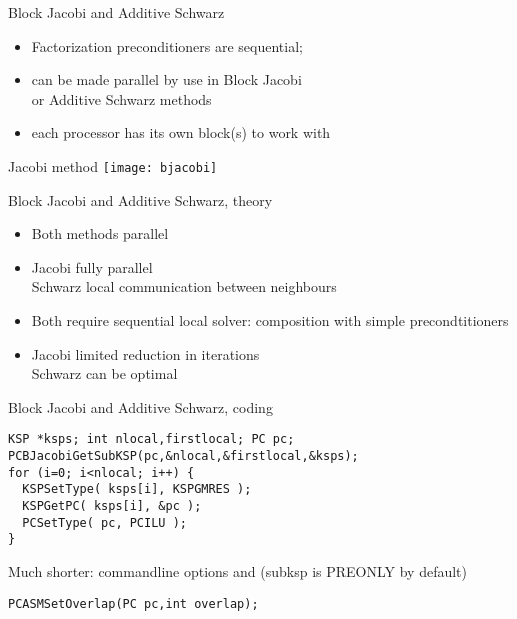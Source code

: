 \begin{higher}
\begin{numberedframe}{Block Jacobi and Additive Schwarz}
  \begin{itemize}
  \item Factorization preconditioners are sequential;
  \item can be made parallel by use in Block Jacobi\\
    or Additive Schwarz methods
  \item each processor has its own block(s) to work with
  \end{itemize}
\end{numberedframe}

\begin{numberedframe}{Jacobi method}
  \texttt{[image: bjacobi]}
\end{numberedframe}

\end{higher}

\begin{longversion}
\begin{numberedframe}{Block Jacobi and Additive Schwarz, theory}
  \begin{itemize}
  \item Both methods parallel
  \item Jacobi fully parallel\\ Schwarz local communication between neighbours
  \item Both require sequential local solver: composition with simple
    precondtitioners
  \item Jacobi limited reduction in iterations\\ Schwarz can be optimal
  \end{itemize}
\end{numberedframe}

\begin{numberedframe}{Block Jacobi and Additive Schwarz, coding}

\begin{lstlisting}
KSP *ksps; int nlocal,firstlocal; PC pc;
PCBJacobiGetSubKSP(pc,&nlocal,&firstlocal,&ksps);
for (i=0; i<nlocal; i++) {
  KSPSetType( ksps[i], KSPGMRES );
  KSPGetPC( ksps[i], &pc );
  PCSetType( pc, PCILU );
}
\end{lstlisting}

Much shorter: commandline options  and 
(subksp is PREONLY  by default)

\begin{lstlisting}
PCASMSetOverlap(PC pc,int overlap);
\end{lstlisting}
\end{numberedframe}

\end{longversion}

